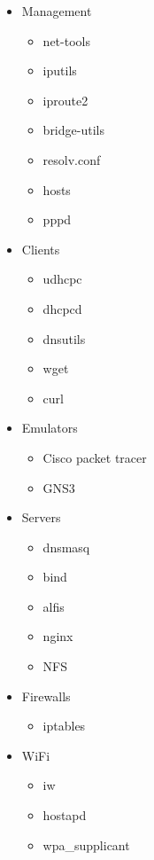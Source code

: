 \begin{itemize}
        \item Management
        \begin{itemize}
            \item net-tools
            \item iputils
            \item iproute2
            \item bridge-utils
            \item resolv.conf
            \item hosts
            \item pppd
        \end{itemize}

        \item Clients
        \begin{itemize}
            \item udhcpc
            \item dhcpcd
            \item dnsutils
            \item wget
            \item curl
        \end{itemize}

        \item Emulators
        \begin{itemize}
            \item Cisco packet tracer
            \item GNS3
        \end{itemize}

        \item Servers
        \begin{itemize}
            \item dnsmasq
            \item bind
            \item alfis
            \item nginx
            \item NFS
        \end{itemize}

        \item Firewalls
        \begin{itemize}
            \item iptables
        \end{itemize}

        \item WiFi
        \begin{itemize}
            \item iw
            \item hostapd
            \item wpa\_supplicant
        \end{itemize}


\end{itemize}
